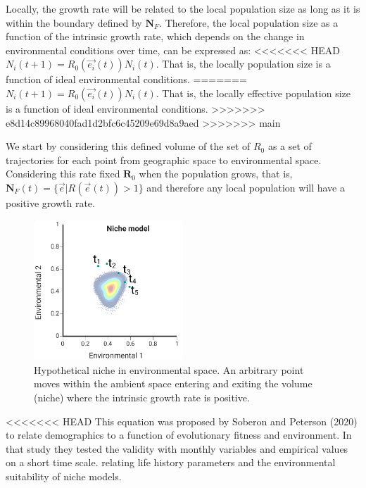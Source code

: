 \documentclass[
]{article}
\begin{document}
Locally, the growth rate will be related to the local population
size as long as it is within the boundary defined by \(\mathbf{N}_F\).
Therefore, the local population size as a function of the intrinsic growth rate, which depends on the change in environmental conditions over time, can be expressed as:
<<<<<<< HEAD
\(N_i(t+1) = R_0(\vec{e_i}(t) ) N_i(t)\). That is, the locally population size is a function of ideal environmental conditions.
=======
\(N_i(t+1) = R_0(\vec{e_i}(t) ) N_i(t)\). That is, the locally effective
population size is a function of ideal environmental conditions.
>>>>>>> e8d14c89968040fad1d2bfc6c45209e69d8a9aed
>>>>>>> main

We start by considering this defined volume of the set of \(R_0\) as a
set of trajectories for each point from geographic space to
environmental space. Considering this rate fixed \(\mathbf{R}_0\) when
the population grows, that is,
\(\mathbf{N}_F(t) = \{\vec{e} | R(\vec{e}(t)) > 1 \}\) and therefore any
local population will have a positive growth rate.

\begin{figure}
\centering
\includegraphics[width=0.5\textwidth,height=\textheight]{all_figures/figure_1.png}
\caption{Hypothetical niche in environmental space. An arbitrary point
moves within the ambient space entering and exiting the volume (niche)
where the intrinsic growth rate is positive.}
\end{figure}

<<<<<<< HEAD
This equation was proposed by Soberon and Peterson (2020) to relate demographics to a function of evolutionary fitness and
environment. In that study they tested the validity with monthly
variables and empirical values on a short time scale. relating life
history parameters and the environmental suitability of niche models.
\end{document}

